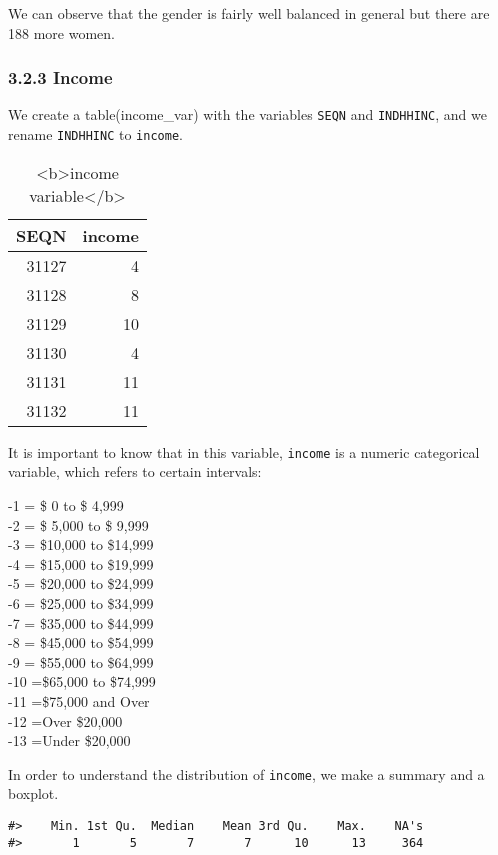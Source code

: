 \documentclass[
]{article}
\begin{document}
We can observe that the gender is fairly well balanced in general but
there are 188 more women.

\hypertarget{income}{%
\subsubsection{3.2.3 Income}\label{income}}

We create a table(income\_var) with the variables \texttt{SEQN} and
\texttt{INDHHINC}, and we rename \texttt{INDHHINC} to \texttt{income}.

\begin{table}

\caption{\label{tab:unnamed-chunk-64}<b>income variable</b>}
\centering
\begin{tabular}[t]{r|r}
\hline
SEQN & income\\
\hline
31127 & 4\\
\hline
31128 & 8\\
\hline
31129 & 10\\
\hline
31130 & 4\\
\hline
31131 & 11\\
\hline
31132 & 11\\
\hline
\end{tabular}
\end{table}

It is important to know that in this variable, \texttt{income} is a
numeric categorical variable, which refers to certain intervals:

-1 = \$ 0 to \$ 4,999\\
-2 = \$ 5,000 to \$ 9,999\\
-3 = \$10,000 to \$14,999\\
-4 = \$15,000 to \$19,999\\
-5 = \$20,000 to \$24,999\\
-6 = \$25,000 to \$34,999\\
-7 = \$35,000 to \$44,999\\
-8 = \$45,000 to \$54,999\\
-9 = \$55,000 to \$64,999\\
-10 =\$65,000 to \$74,999\\
-11 =\$75,000 and Over\\
-12 =Over \$20,000\\
-13 =Under \$20,000

In order to understand the distribution of \texttt{income}, we make a
summary and a boxplot.

\begin{verbatim}
#>    Min. 1st Qu.  Median    Mean 3rd Qu.    Max.    NA's 
#>       1       5       7       7      10      13     364
\end{verbatim}
\end{document}
